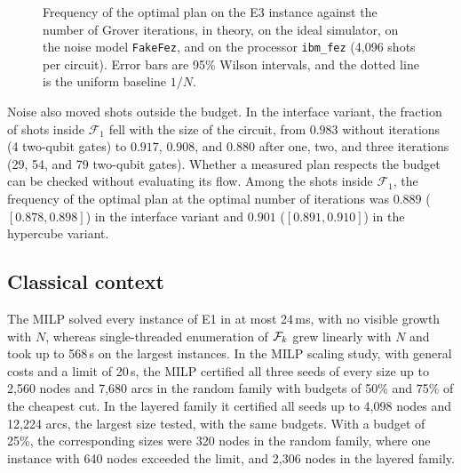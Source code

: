 \begin{figure}[t]
\centering

\caption{Frequency of the optimal plan on the E3 instance against the number of Grover iterations, in theory, on the ideal simulator, on the noise model \texttt{FakeFez}, and on the processor \texttt{ibm\_fez} (4{,}096 shots per circuit). Error bars are 95\% Wilson intervals, and the dotted line is the uniform baseline $1/N$.}\label{fig:amplification}
\end{figure}

Noise also moved shots outside the budget. In the interface variant, the fraction of shots inside $\mathcal{F}_1$ fell with the size of the circuit, from $0.983$ without iterations (4 two-qubit gates) to $0.917$, $0.908$, and $0.880$ after one, two, and three iterations (29, 54, and 79 two-qubit gates). Whether a measured plan respects the budget can be checked without evaluating its flow. Among the shots inside $\mathcal{F}_1$, the frequency of the optimal plan at the optimal number of iterations was $0.889$ ($[0.878,0.898]$) in the interface variant and $0.901$ ($[0.891,0.910]$) in the hypercube variant.



\subsection{Classical context}\label{sec:results-classical}
The MILP solved every instance of E1 in at most 24\,ms, with no visible growth with $N$, whereas single-threaded enumeration of $\mathcal{F}_k$ grew linearly with $N$ and took up to 568\,s on the largest instances. In the MILP scaling study, with general costs and a limit of 20\,s, the MILP certified all three seeds of every size up to 2{,}560 nodes and 7{,}680 arcs in the random family with budgets of 50\% and 75\% of the cheapest cut. In the layered family it certified all seeds up to 4{,}098 nodes and 12{,}224 arcs, the largest size tested, with the same budgets. With a budget of 25\%, the corresponding sizes were 320 nodes in the random family, where one instance with 640 nodes exceeded the limit, and 2{,}306 nodes in the layered family.
